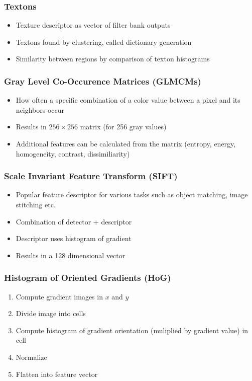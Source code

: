 \begin{multicols}{2}
    \subsubsection{Textons}
    \begin{itemize}
        \item Texture descriptor as vector of filter bank outputs
        \item Textons found by clustering, called dictionary generation
        \item Similarity between regions by comparison of texton histograms
    \end{itemize}

    \subsubsection{Gray Level Co-Occurence Matrices (GLMCMs)}
    \begin{itemize}
        \item How often a specific combination of a color value between a pixel and its neighbors occur
        \item Results in $256\times 256$ matrix (for 256 gray values)
        \item Additional features can be calculated from the matrix (entropy, energy, homogeneity, contrast, dissimiliarity)
    \end{itemize}

    \subsubsection{Scale Invariant Feature Transform (SIFT)}
    \begin{itemize}
        \item Popular feature descriptor for various tasks such as object matching, image stitching etc.
        \item Combination of detector + descriptor
        \item Descriptor uses histogram of gradient
        \item Results in a 128 dimensional vector
    \end{itemize}

    \subsubsection{Histogram of Oriented Gradients (HoG)}
    \begin{enumerate}
        \item Compute gradient images in $x$ and $y$
        \item Divide image into cells
        \item Compute histogram of gradient orientation (muliplied by gradient value) in cell
        \item Normalize
        \item Flatten into feature vector
    \end{enumerate}


\end{multicols}
